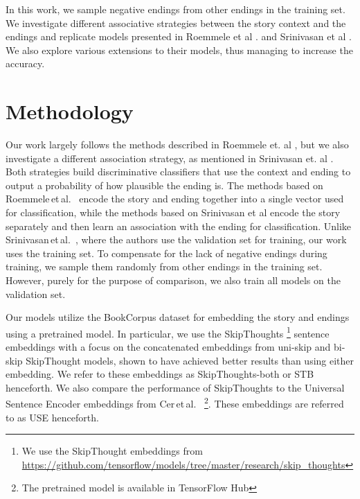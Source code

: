 \documentclass{article}
\begin{document}
In this work, we sample negative endings from other endings in the training set. We investigate different associative strategies between the story context and the endings and replicate models presented in Roemmele et al \citep{Roemmele2017AnTest}. and Srinivasan et al \citep{Srinivasan2018ATest}. We also explore various extensions to their models, thus managing to increase the accuracy.

\section{Methodology}
Our work largely follows the methods described in Roemmele et. al \citep{Roemmele2017AnTest}, but we also investigate a different association strategy, as mentioned in Srinivasan et. al \citep{Srinivasan2018ATest}. Both strategies build discriminative classifiers that use the context and ending to output a probability of how plausible the ending is. The methods based on Roemmele\,et\,al.\ \citep{Roemmele2017AnTest} encode the story and ending together into a single vector used for classification, while the methods based on Srinivasan et al encode the story separately and then learn an association with the ending for classification. Unlike Srinivasan\,et\,al.\ \citep{Srinivasan2018ATest}, where the authors use the validation set for training, our work uses the training set. To compensate for the lack of negative endings during training, we sample them randomly from other endings in the training set. However, purely for the purpose of comparison, we also train all models on the validation set. 

Our models utilize the BookCorpus dataset \citep{Zhu2015AligningBooks} for embedding the story and endings using a pretrained model. In particular, we use the SkipThoughts \citep{Kiros2015Skip-ThoughtVectors}\footnote{We use the SkipThought embeddings from \url{https://github.com/tensorflow/models/tree/master/research/skip_thoughts}} sentence embeddings with a focus on the concatenated embeddings from uni-skip and bi-skip SkipThought models, shown to have achieved better results than using either embedding. We refer to these embeddings as SkipThoughts-both or STB henceforth. We also compare the performance of SkipThoughts to the Universal Sentence Encoder embeddings from Cer\,et\,al.\ \citep{2018arXiv180311175C} \footnote{The pretrained model is available in TensorFlow Hub}. These embeddings are referred to as USE henceforth.
\end{document}
